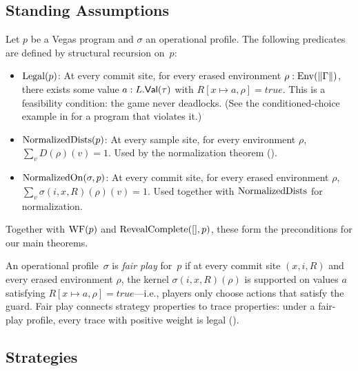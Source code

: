 \documentclass[11pt]{article}
\begin{document}
\subsection{Standing Assumptions}\label{sec:assumptions}

\begin{definition}\label{def:standing}
Let $p$ be a Vegas program and $\sigma$ an operational profile. The following
predicates are defined by structural recursion on~$p$:
\begin{itemize}[nosep]
\item $\mathrm{Legal}(p)$: At every commit site, for every erased environment
      $\rho : \mathrm{Env}(\|\Gamma\|)$, there exists some value
      $a : L.\mathsf{Val}(\tau)$ with $R[x \mapsto a, \rho] = \mathit{true}$.
      This is a feasibility condition: the game never deadlocks.
      (See the conditioned-choice example in  for a
      program that violates it.)

\item $\mathrm{NormalizedDists}(p)$: At every sample site, for every environment $\rho$,
      $\sum_{v} D(\rho)(v) = 1$. Used by the normalization theorem
      ().

\item $\mathrm{NormalizedOn}(\sigma, p)$: At every commit site, for every erased environment
      $\rho$, $\sum_{v} \sigma(i, x, R)(\rho)(v) = 1$. Used together with
      $\mathrm{NormalizedDists}$ for normalization.
\end{itemize}
\end{definition}

\noindent
Together with $\mathrm{WF}(p)$ and $\mathrm{RevealComplete}([], p)$, these form the
preconditions for our main theorems.

\begin{definition}\label{def:admissible}
An operational profile~$\sigma$ is \emph{fair play} for~$p$ if at every commit
site $(x, i, R)$ and every erased environment $\rho$, the kernel
$\sigma(i, x, R)(\rho)$ is supported on values
$a$ satisfying $R[x \mapsto a, \rho] = \mathit{true}$---i.e., players only
choose actions that satisfy the guard. Fair play connects strategy properties
to trace properties: under a fair-play profile, every trace with positive
weight is legal ().
\end{definition}


\subsection{Strategies}\label{sec:strategies}
\end{document}
